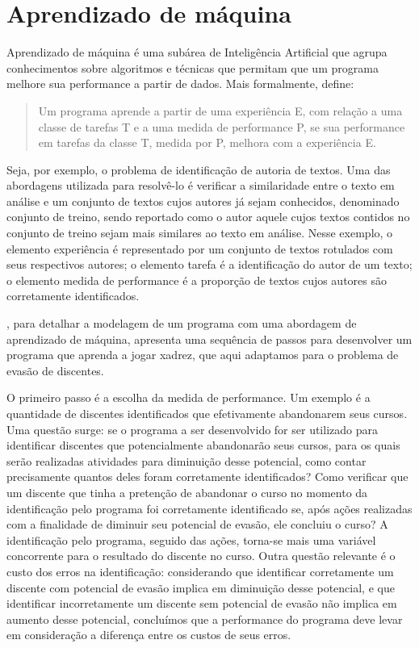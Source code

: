 \chapter{Aprendizado de máquina}

Aprendizado de máquina é uma subárea de Inteligência Artificial que agrupa conhecimentos sobre algoritmos e técnicas que permitam que um programa melhore sua performance a partir de dados. Mais formalmente, \cite[p.2, tradução nossa]{Tom_mitchell} define:

\begin{quote}
Um programa aprende a partir de uma experiência E, com relação a uma classe de tarefas T e a uma medida de performance P, se sua performance em tarefas da classe T, medida por P, melhora com a experiência E.
\end{quote}

Seja, por exemplo, o problema de identificação de autoria de textos. Uma das abordagens utilizada para resolvê-lo é verificar a similaridade entre o texto em análise e um conjunto de textos cujos autores já sejam conhecidos, denominado conjunto de treino, sendo reportado como o autor aquele cujos textos contidos no conjunto de treino sejam mais similares ao texto em análise. Nesse exemplo, o elemento experiência é representado por um conjunto de textos rotulados com seus respectivos autores; o elemento tarefa é a identificação do autor de um texto; o elemento medida de performance é a proporção de textos cujos autores são corretamente identificados.

\cite{Tom_mitchell}, para detalhar a modelagem de um programa com uma abordagem de aprendizado de máquina, apresenta uma sequência de passos para desenvolver um programa que aprenda a jogar xadrez, que aqui adaptamos para o problema de evasão de discentes.


O primeiro passo é a escolha da medida de performance. Um exemplo é a quantidade de discentes identificados que efetivamente abandonarem seus cursos. Uma questão surge: se o programa a ser desenvolvido for ser utilizado para identificar discentes que potencialmente abandonarão seus cursos, para os quais serão realizadas atividades para diminuição desse potencial, como contar precisamente quantos deles foram corretamente identificados? Como verificar que um discente que tinha a pretenção de abandonar o curso no momento da identificação pelo programa foi corretamente identificado se, após ações realizadas com a finalidade de diminuir seu potencial de evasão, ele concluiu o curso? A identificação pelo programa, seguido das ações, torna-se mais uma variável concorrente para o resultado do discente no curso. Outra questão relevante é o custo dos erros na identificação: considerando que identificar corretamente um discente com potencial de evasão implica em diminuição desse potencial, e que identificar incorretamente um discente sem potencial de evasão não implica em aumento desse potencial, concluímos que a performance do programa deve levar em consideração a diferença entre os custos de seus erros. 

